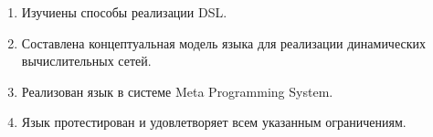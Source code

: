 \begin{enumerate}
	
	\item Изучиены способы реализации DSL.
	\item Составлена концептуальная модель языка для реализации динамических вычислительных сетей.
	\item Реализован язык в системе Meta Programming System.
	\item Язык протестирован и удовлетворяет всем указанным ограничениям.
\end{enumerate}
